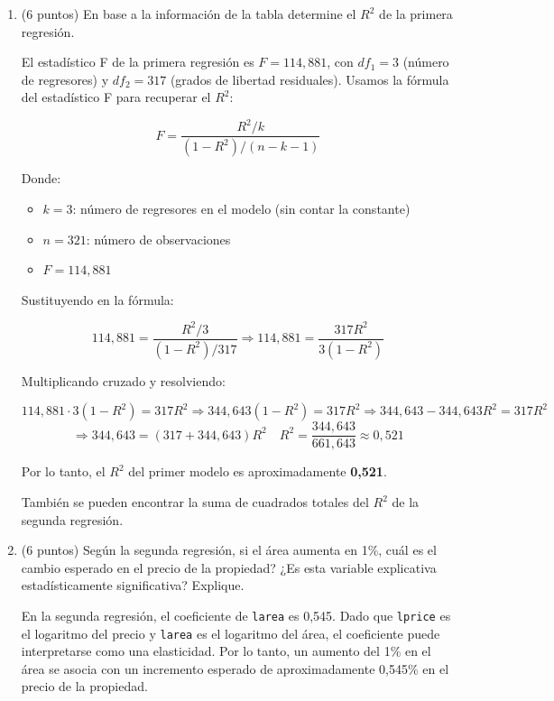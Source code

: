 \documentclass[10pt,a4paper]{article}
\begin{document}
\begin{enumerate}
\begin{enumerate}
    \item (6 puntos) En base a la información de la tabla determine el $R^2$ de la primera regresión.

    {\color{blue} El estadístico F de la primera regresión es \( F = 114{,}881 \), con \( df_1 = 3 \) (número de regresores) y \( df_2 = 317 \) (grados de libertad residuales). Usamos la fórmula del estadístico F para recuperar el \( R^2 \):

    \[
    F = \frac{R^2 / k}{(1 - R^2) / (n - k - 1)}
    \]

    Donde:
    \begin{itemize}
        \item \( k = 3 \): número de regresores en el modelo (sin contar la constante)
        \item \( n = 321 \): número de observaciones
        \item \( F = 114{,}881 \)
    \end{itemize}

    Sustituyendo en la fórmula:

    \[
    114{,}881 = \frac{R^2 / 3}{(1 - R^2) / 317}
    \Rightarrow 114{,}881 = \frac{317 R^2}{3 (1 - R^2)}
    \]

    Multiplicando cruzado y resolviendo:

    \[
    114{,}881 \cdot 3 (1 - R^2) = 317 R^2
    \Rightarrow 344{,}643 (1 - R^2) = 317 R^2
    \Rightarrow 344{,}643 - 344{,}643 R^2 = 317 R^2
   \]
    \[\Rightarrow 344{,}643 = (317 + 344{,}643) R^2 \quad R^2 = \frac{344{,}643}{661{,}643} \approx 0{,}521
    \]

    Por lo tanto, el \( R^2 \) del primer modelo es aproximadamente \textbf{0{,}521}.

También se pueden encontrar la suma de cuadrados totales del $R^2$ de la segunda regresión.}
    \item (6 puntos) Según la segunda regresión, si el área aumenta en 1\%, cuál es el cambio esperado en el precio de la propiedad? ¿Es esta variable explicativa estadísticamente significativa? Explique.  

    {\color{blue}  En la segunda regresión, el coeficiente de \texttt{larea} es 0{,}545. Dado que \texttt{lprice} es el logaritmo del precio y \texttt{larea} es el logaritmo del área, el coeficiente puede interpretarse como una elasticidad. Por lo tanto, un aumento del 1\% en el área se asocia con un incremento esperado de aproximadamente 0{,}545\% en el precio de la propiedad.

}
\end{enumerate}
\end{enumerate}
\end{document}
